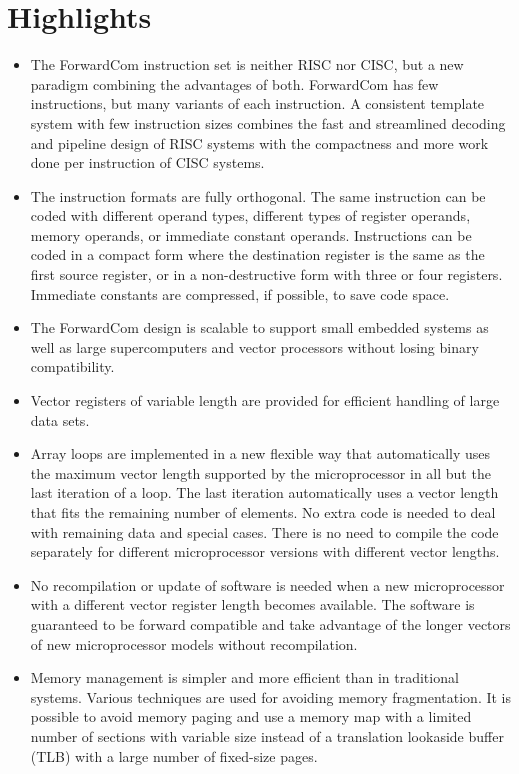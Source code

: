 \documentclass[forwardcom.tex]{subfiles}
\begin{document}
\section{Highlights}
\begin{itemize}
\item The ForwardCom instruction set is neither RISC nor CISC, but a new paradigm combining the advantages of both. ForwardCom has few instructions, but many variants of each instruction. A consistent template system with few instruction sizes combines the fast and streamlined decoding and pipeline design of RISC systems with the compactness and more work done per instruction of CISC systems. 

\item The instruction formats are fully orthogonal. The same instruction can be coded with different operand types, different types of register operands, memory operands, or immediate constant operands. Instructions can be coded in a compact form where the destination register is the same as the first source register, or in a non-destructive form with three or four registers. Immediate constants are compressed, if possible, to save code space.

\item The ForwardCom design is scalable to support small embedded systems as well as large supercomputers and vector processors without losing binary compatibility.

\item Vector registers of variable length are provided for efficient handling of large data sets.

\item Array loops are implemented  in a new flexible way that automatically uses the maximum vector length supported by the microprocessor in all but the last iteration of a loop. The last iteration automatically uses a vector length that fits the remaining number of elements. No extra code is needed to deal with remaining data and special cases. There is no need to compile the code separately for different microprocessor versions with different vector lengths.

\item No recompilation or update of software is needed when a new microprocessor with a different vector register length becomes available. The software is guaranteed to be forward compatible and take advantage of the longer vectors of new microprocessor models without recompilation.

\item Memory management is simpler and more efficient than in traditional systems. Various techniques are used for avoiding memory fragmentation. 
It is possible to avoid memory paging and use a memory map with a limited number of sections with variable size instead of a translation lookaside buffer (TLB) with a large number of fixed-size pages.


\end{itemize}
\end{document}
